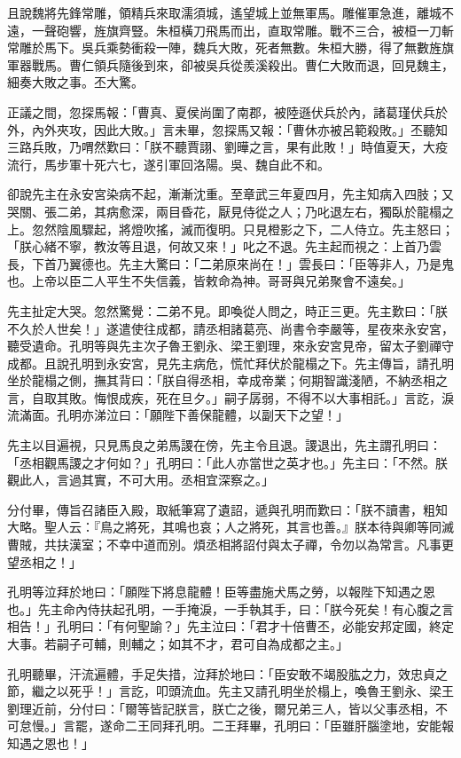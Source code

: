 且說魏將先鋒常雕，領精兵來取濡須城，遙望城上並無軍馬。雕催軍急進，離城不遠，一聲砲響，旌旗齊豎。朱桓橫刀飛馬而出，直取常雕。戰不三合，被桓一刀斬常雕於馬下。吳兵乘勢衝殺一陣，魏兵大敗，死者無數。朱桓大勝，得了無數旌旗軍器戰馬。曹仁領兵隨後到來，卻被吳兵從羨溪殺出。曹仁大敗而退，回見魏主，細奏大敗之事。丕大驚。

正議之間，忽探馬報：「曹真、夏侯尚圍了南郡，被陸遜伏兵於內，諸葛瑾伏兵於外，內外夾攻，因此大敗。」言未畢，忽探馬又報：「曹休亦被呂範殺敗。」丕聽知三路兵敗，乃喟然歎曰：「朕不聽賈詡、劉曄之言，果有此敗！」時值夏天，大疫流行，馬步軍十死六七，遂引軍回洛陽。吳、魏自此不和。

卻說先主在永安宮染病不起，漸漸沈重。至章武三年夏四月，先主知病入四肢；又哭關、張二弟，其病愈深，兩目昏花，厭見侍從之人；乃叱退左右，獨臥於龍榻之上。忽然陰風驟起，將燈吹搖，滅而復明。只見橙影之下，二人侍立。先主怒曰；「朕心緒不寧，教汝等且退，何故又來！」叱之不退。先主起而視之：上首乃雲長，下首乃翼德也。先主大驚曰：「二弟原來尚在！」雲長曰：「臣等非人，乃是鬼也。上帝以臣二人平生不失信義，皆敕命為神。哥哥與兄弟聚會不遠矣。」

先主扯定大哭。忽然驚覺：二弟不見。即喚從人問之，時正三更。先主歎曰：「朕不久於人世矣！」遂遣使往成都，請丞相諸葛亮、尚書令李嚴等，星夜來永安宮，聽受遺命。孔明等與先主次子魯王劉永、梁王劉理，來永安宮見帝，留太子劉禪守成都。且說孔明到永安宮，見先主病危，慌忙拜伏於龍榻之下。先主傳旨，請孔明坐於龍榻之側，撫其背曰：「朕自得丞相，幸成帝業；何期智識淺陋，不納丞相之言，自取其敗。悔恨成疾，死在旦夕。」嗣子孱弱，不得不以大事相託。」言訖，淚流滿面。孔明亦涕泣曰：「願陛下善保龍體，以副天下之望！」

先主以目遍視，只見馬良之弟馬謖在傍，先主令且退。謖退出，先主謂孔明曰：「丞相觀馬謖之才何如？」孔明曰：「此人亦當世之英才也。」先主曰：「不然。朕觀此人，言過其實，不可大用。丞相宜深察之。」

分付畢，傳旨召諸臣入殿，取紙筆寫了遺詔，遞與孔明而歎曰：「朕不讀書，粗知大略。聖人云：『鳥之將死，其鳴也哀；人之將死，其言也善。』朕本待與卿等同滅曹賊，共扶漢室；不幸中道而別。煩丞相將詔付與太子禪，令勿以為常言。凡事更望丞相之！」

孔明等泣拜於地曰：「願陛下將息龍體！臣等盡施犬馬之勞，以報陛下知遇之恩也。」先主命內侍扶起孔明，一手掩淚，一手執其手，曰：「朕今死矣！有心腹之言相告！」孔明曰：「有何聖諭？」先主泣曰：「君才十倍曹丕，必能安邦定國，終定大事。若嗣子可輔，則輔之；如其不才，君可自為成都之主。」

孔明聽畢，汗流遍體，手足失措，泣拜於地曰：「臣安敢不竭股肱之力，效忠貞之節，繼之以死乎！」言訖，叩頭流血。先主又請孔明坐於榻上，喚魯王劉永、梁王劉理近前，分付曰：「爾等皆記朕言，朕亡之後，爾兄弟三人，皆以父事丞相，不可怠慢。」言罷，遂命二王同拜孔明。二王拜畢，孔明曰：「臣雖肝腦塗地，安能報知遇之恩也！」

